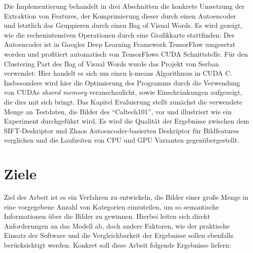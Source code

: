 Die Implementierung behandelt in drei Abschnitten die konkrete Umsetzung der Extraktion von Features, der Komprimierung dieser durch einen Autoencoder und letztlich das Gruppieren durch einen Bag of Visual Words. Es wird gezeigt, wie die  rechenintensiven Operationen durch eine Grafikkarte stattfinden: Der Autoencoder ist in Googles Deep Learning Framework TensorFlow umgesetzt worden und profitiert automatisch von TensorFlows CUDA Schnittstelle. Für den Clustering Part des Bag of Visual Words wurde das Projekt von Serban verwendet: Hier handelt es sich um einen k-means Algorithmus in CUDA C. Insbesondere wird hier die Optimierung des Programms durch die Verwendung von CUDAs \textit{shared memory} veranschaulicht, sowie Einschränkungen aufgezeigt, die dies mit sich bringt.\newline
Das Kapitel Evaluierung stellt zunächst die verwendete Menge an Testdaten, die Bilder des \enquote{Caltech101}, vor und illustriert wie ein Experiment durchgeführt wird. Es wird die Qualität der Ergebnisse zwischen dem SIFT-Deskriptor und Zhaos Autoencoder-basierten Deskriptor für Bildfeatures verglichen und die Laufzeiten von CPU und GPU Varianten gegenübergestellt.


\section{Ziele}

Ziel der Arbeit ist es ein Verfahren zu entwickeln, die Bilder einer große Menge in eine vorgegebene Anzahl von Kategorien einzuteilen, um so semantische Informationen über die Bilder zu gewinnen. Hierbei leiten sich direkt Anforderungen an das Modell ab, doch andere Faktoren, wie der praktische Einsatz der Software und die Vergleichbarkeit der Ergebnisse sollen ebenfalls berücksichtigt werden. Konkret soll diese Arbeit folgende Ergebnisse liefern:

